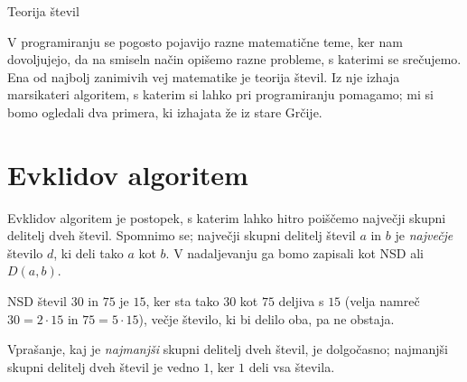 
Teorija števil


V programiranju se pogosto pojavijo razne matematične teme, ker nam dovoljujejo,
da na smiseln način opišemo razne probleme, s katerimi se srečujemo.
Ena od najbolj zanimivih vej matematike je teorija števil.
Iz nje izhaja marsikateri algoritem, s katerim si lahko pri programiranju
pomagamo; mi si bomo ogledali dva primera, ki izhajata že iz stare Grčije.

\section{Evklidov algoritem}

Evklidov algoritem je postopek, s katerim lahko hitro poiščemo največji skupni
delitelj dveh števil.
Spomnimo se; največji skupni delitelj števil $a$ in $b$ je \emph{največje}
število $d$, ki deli tako $a$ kot $b$.
V nadaljevanju ga bomo zapisali kot NSD ali $D(a, b)$.
\begin{examples}
  NSD števil $30$ in $75$ je $15$, ker sta tako $30$ kot
  $75$ deljiva s $15$ (velja namreč $30 = 2 \cdot 15$ in $75 = 5 \cdot 15$),
  večje število, ki bi delilo oba, pa ne obstaja.
\end{examples}
\begin{examples}
  Vprašanje, kaj je \emph{najmanjši} skupni delitelj dveh števil, je dolgočasno;
  najmanjši skupni delitelj dveh števil je vedno $1$, ker $1$ deli vsa števila.
\end{examples}

